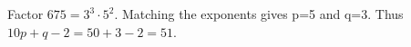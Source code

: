Factor $675=3^3\cdot5^2$. Matching the exponents gives p=5 and q=3. Thus $10p+q-2=50+3-2=\boxed{51}$.
